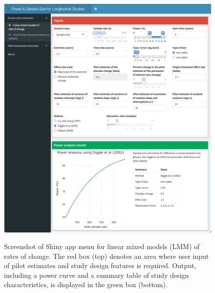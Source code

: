 \begin{figure}[ht]
	\includegraphics[width=14cm]{Figures/LMM-screenshot.pdf}\\
	\caption{Screenshot of Shiny app menu for linear mixed models (LMM) of rates of change. The red box (top) denotes an area where user input of pilot estimates and study design features is required. Output, including a power curve and a summary table of study design characteristics, is displayed in the green box (bottom).}\label{LMMinput}
\end{figure}

